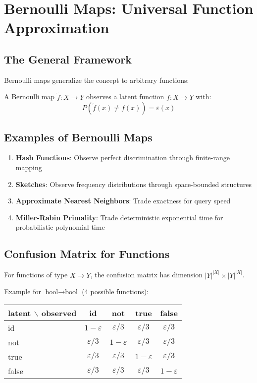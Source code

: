 \section{Bernoulli Maps: Universal Function Approximation}

\subsection{The General Framework}

Bernoulli maps generalize the concept to arbitrary functions:

\begin{definition}
A Bernoulli map $\tilde{f}: X \to Y$ observes a latent function $f: X \to Y$ with:
\begin{equation}
P(\tilde{f}(x) \neq f(x)) = \varepsilon(x)
\end{equation}
\end{definition}

\subsection{Examples of Bernoulli Maps}

\begin{enumerate}
\item \textbf{Hash Functions}: Observe perfect discrimination through finite-range mapping
\item \textbf{Sketches}: Observe frequency distributions through space-bounded structures
\item \textbf{Approximate Nearest Neighbors}: Trade exactness for query speed
\item \textbf{Miller-Rabin Primality}: Trade deterministic exponential time for probabilistic polynomial time
\end{enumerate}

\subsection{Confusion Matrix for Functions}

For functions of type $X \to Y$, the confusion matrix has dimension $|Y|^{|X|} \times |Y|^{|X|}$.

Example for $\text{bool} \to \text{bool}$ (4 possible functions):

\begin{table}[h]
\centering
\begin{tabular}{|l|cccc|}
\hline
latent $\backslash$ observed & id & not & true & false \\
\hline
id & $1-\varepsilon$ & $\varepsilon/3$ & $\varepsilon/3$ & $\varepsilon/3$ \\
not & $\varepsilon/3$ & $1-\varepsilon$ & $\varepsilon/3$ & $\varepsilon/3$ \\
true & $\varepsilon/3$ & $\varepsilon/3$ & $1-\varepsilon$ & $\varepsilon/3$ \\
false & $\varepsilon/3$ & $\varepsilon/3$ & $\varepsilon/3$ & $1-\varepsilon$ \\
\hline
\end{tabular}
\end{table}

